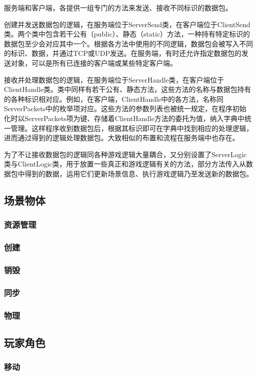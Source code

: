 \documentclass[conference]{IEEEtran}
\begin{document}
服务端和客户端，各提供一组专门的方法来发送、接收不同标识的数据包。

创建并发送数据包的逻辑，在服务端位于ServerSend类，在客户端位于ClientSend类。两个类中包含若干公有（public）、静态（static）方法，一种持有特定标识的数据包至少会对应其中一个。根据各方法中使用的不同逻辑，数据包会被写入不同的标识、数据，并通过TCP或UDP发送。在服务端，有时还允许指定数据包的发送对象，可以是所有已连接的客户端或某些特定客户端。

接收并处理数据包的逻辑，在服务端位于ServerHandle类，在客户端位于ClientHandle类。类中同样有若干公有、静态方法，这些方法的名称与数据包持有的各种标识相对应。例如，在客户端，ClientHandle中的各方法，名称同ServerPackets中的枚举项对应。这些方法的参数列表也被统一规定，在程序初始化时以ServerPackets项为键、存储着ClientHandle方法的委托为值，纳入字典中统一管理。这样程序收到数据包后，根据其标识即可在字典中找到相应的处理逻辑，进而通过得到的逻辑处理数据包。大致相似的布置和流程在服务端中也存在。

为了不让接收数据包的逻辑同各种游戏逻辑大量耦合，又分别设置了ServerLogic类与ClientLogic类，用于放置一些真正和游戏逻辑有关的方法，部分方法传入从数据包中得到的数据，运用它们更新场景信息、执行游戏逻辑乃至发送新的数据包。


\subsection{场景物体}
\subsubsection{资源管理}
\subsubsection{创建}
\subsubsection{销毁}
\subsubsection{同步}
\subsubsection{物理}


\subsection{玩家角色}
\subsubsection{移动}
\end{document}
